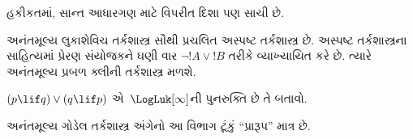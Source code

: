 હકીકતમાં, સાન્ત આધારગણ માટે વિપરીત દિશા પણ સાચી છે.

અનંતમૂલ્ય લુકાશેવિચ તર્કશાસ્ત્ર સૌથી પ્રચલિત અસ્પષ્ટ
તર્કશાસ્ત્ર છે. અસ્પષ્ટ તર્કશાસ્ત્રના સાહિત્યમાં પ્રેરણ સંયોજકને
ઘણી વાર $\lnot !A \lor !B$ તરીકે વ્યાખ્યાયિત કરે છે. ત્યારે
અનંતમૂલ્ય પ્રબળ ક્લીની તર્કશાસ્ત્ર મળશે.

\begin{prob}
  $(p \lif q) \lor (q \lif p)$ એ~$\LogLuk[\infty]$ની
  પુનરુક્તિ છે તે બતાવો.
\end{prob}
\endgroup


\begingroup
\makeatletter{}\makeatother


\label{guunit:OLP-0401}


\begin{editorial}
  અનંતમૂલ્ય ગોડેલ તર્કશાસ્ત્ર અંગેનો આ વિભાગ ટૂંકું
  ``પ્રારૂપ'' માત્ર છે.
\end{editorial}

